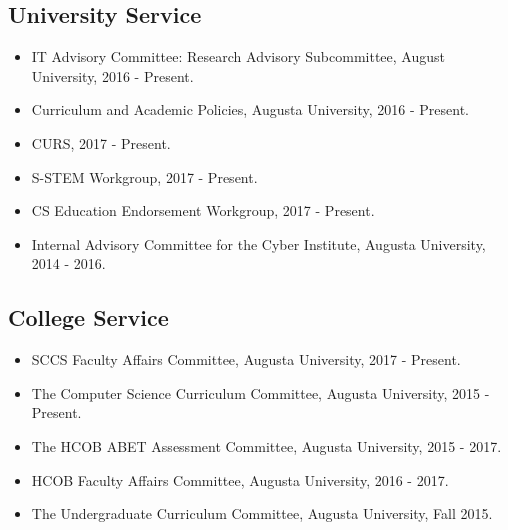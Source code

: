 \documentclass{article}
\begin{document}
  \subsection{University Service}
  \label{subsec:university_service}
  \begin{itemize}
  \item[] IT Advisory Committee: Research Advisory Subcommittee,
    August University, 2016 - Present.
  \item[] Curriculum and Academic Policies, Augusta University, 2016 - Present.
  \item[] CURS, 2017 - Present.
  \item[] S-STEM Workgroup, 2017 - Present.
  \item[] CS Education Endorsement Workgroup, 2017 - Present.
  \item[] Internal Advisory Committee for the Cyber Institute, Augusta University, 2014 - 2016.
  \end{itemize}

  \subsection{College Service}
  \label{subsec:college_service}
  \begin{itemize}
  \item[] SCCS Faculty Affairs Committee, Augusta University, 2017 - Present.    
  \item[] The Computer Science Curriculum Committee, Augusta University, 2015 - Present.
  \item[] The HCOB ABET Assessment Committee, Augusta University, 2015 - 2017. 
  \item[] HCOB Faculty Affairs Committee, Augusta University, 2016 - 2017.
  \item[] The Undergraduate Curriculum Committee, Augusta University, Fall 2015.     
  \end{itemize}
\end{document}
